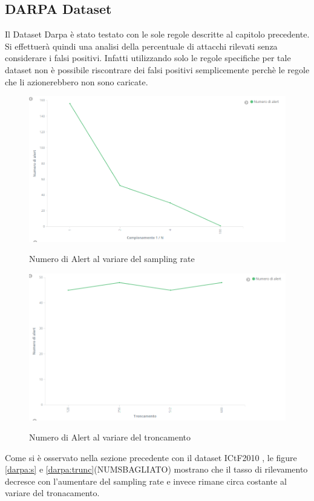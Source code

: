 \documentclass[12pt,a4paper,openright,twoside]{report}
\begin{document}
\subsection{DARPA Dataset}

Il Dataset Darpa \`e stato testato con le sole regole descritte al capitolo precedente.
Si effettuer\`a quindi una analisi della percentuale di attacchi rilevati senza considerare i
falsi positivi. Infatti utilizzando solo le regole specifiche per tale dataset non
\`e possibile riscontrare dei falsi positivi semplicemente perch\`e le regole che li azionerebbero
non sono caricate.

\begin{figure}[h!]
\begin{center}                          %
  \includegraphics[width=\textwidth]{images/DARPA-sampling-rate.png}
  \caption{Numero di Alert al variare del sampling rate}\label{darpa:s}
  \label{}
\end{center}
\end{figure}
\begin{figure}[h!]
\begin{center}                          %
  \includegraphics[width=\textwidth]{images/DARPA-troncamento.png}\label{darpa:trunc}
  \caption{Numero di Alert al variare del troncamento}
  \label{}
\end{center}
\end{figure}
 Come si \`e osservato nella sezione precedente con il dataset ICtF2010 , le figure \ref{darpa:s}
 e \ref{darpa:trunc}(NUMSBAGLIATO) mostrano che il tasso di rilevamento decresce con l'aumentare del
 sampling rate e invece rimane circa costante al variare del tronacamento.
\end{document}
